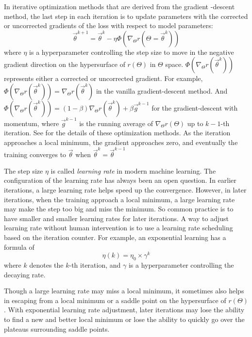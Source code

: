 In iterative optimization methods that are derived from the gradient -descent method, the last step in each iteration is to update parameters with the corrected or uncorrected gradients of the loss with respect to model parameters:
\begin{equation}
    \vec{\theta}^{k+1} = \vec{\theta}^{k} - \eta\Phi(\nabla_{\Theta}r(\Theta=\vec{\theta}^k))
\end{equation}
where $\eta$ is a hyperparameter controlling the step size to move in the negative gradient direction on the hypersurface of $r(\Theta)$ in $\Theta$ space.
$\Phi(\nabla_{\Theta}r(\vec{\theta}^k))$ represents either a corrected or uncorrected gradient.
For example, $\Phi(\nabla_{\Theta}r(\vec{\theta}^k))=\nabla_{\Theta}r(\vec{\theta}^k)$ in the vanilla gradient-descent method.
And $\Phi(\nabla_{\Theta}r(\vec{\theta}^k)) = \left(1-\beta\right)\nabla_{\Theta}r(\vec{\theta}^k) + \beta \vec{g}^{k-1}$ for the gradient-descent with momentum, where $\vec{g}^{k-1}$ is the running average of $\nabla_{\Theta}r(\Theta)$ up to $k-1$-th iteration.
See \cite[Section~8.3]{goodfellow_deep_2016} for the details of these optimization methods.
As the iteration approaches a local minimum, the gradient approaches zero, and eventually the training converges to $\vec{\theta}$ when $\vec{\theta}^k=\vec{\theta}^{k-1}$

The step size $\eta$ is called {\it learning rate} in modern machine learning.
The configuration of the learning rate has always been an open question.
In earlier iterations, a large learning rate helps speed up the convergence.
However, in later iterations, when the training approach a local minimum, a large learning rate may make the step too big and miss the minimum.
So common practice is to have smaller and smaller learning rates for later iterations.
A way to adjust learning rate without human intervention is to use a learning rate scheduling based on the iteration counter.
For example, an exponential learning has a formula of
\begin{equation}
    \eta(k) = \eta_0 \times \gamma^k
\end{equation}
where $k$ denotes the $k$-th iteration, and $\gamma$ is a hyperparameter controlling the decaying rate.

Though a large learning rate may miss a local minimum, it sometimes also helps in escaping from a local minimum or a saddle point on the hypersurface of $r(\Theta)$.
With exponential learning rate adjustment, later iterations may lose the ability to find a new and better local minimum or lose the ability to quickly go over the plateaus surrounding saddle points.

